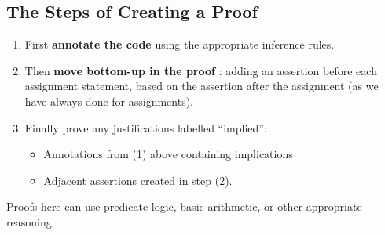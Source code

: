 \documentclass{article}
\begin{document}
\subsection{The Steps of Creating a Proof}
\begin{enumerate}
\item First \textbf{annotate the code} using the appropriate inference rules.
\item Then \textbf{move bottom-up in the proof} : adding an assertion before
each assignment statement, based on the assertion after the
assignment (as we have always done for assignments).
\item Finally prove any justifications labelled “implied”:
\begin{itemize}
\item Annotations from (1) above containing implications
\item Adjacent assertions created in step (2).
\end{itemize}
\end{enumerate}

Proofs here can use predicate logic, basic arithmetic, or other
appropriate reasoning
\end{document}

